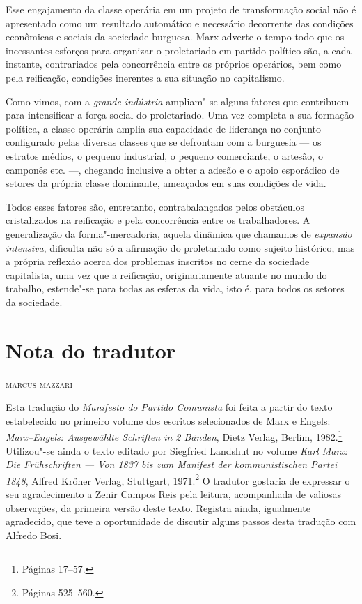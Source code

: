 Esse engajamento da classe operária em um projeto de transformação
social não é apresentado como um resultado automático e necessário
decorrente das condições econômicas e sociais da sociedade burguesa.
Marx adverte o tempo todo que os incessantes esforços para organizar o
proletariado em partido político são, a cada instante, contrariados
pela concorrência entre os próprios operários, bem como pela reificação,
condições inerentes a sua situação no capitalismo.

Como vimos, com a \textit{grande indústria} ampliam"-se alguns fatores que
contribuem para intensificar a força social do proletariado. Uma vez
completa a sua formação política, a classe operária amplia sua
capacidade de liderança no conjunto configurado pelas diversas classes
que se defrontam com a burguesia --- os estratos médios, o pequeno
industrial, o pequeno comerciante, o artesão, o camponês etc. ---, chegando
inclusive a obter a adesão e o apoio esporádico de setores da própria
classe dominante, ameaçados em suas condições de vida. 

Todos esses fatores são, entretanto, contrabalançados pelos obstáculos
cristalizados na reificação e pela concorrência entre os trabalhadores.
A generalização da forma"-mercadoria, aquela dinâmica que chamamos de
\textit{expansão intensiva}, dificulta não só a afirmação do proletariado como
sujeito histórico, mas a própria reflexão acerca dos problemas
inscritos no cerne da sociedade capitalista, uma vez que a reificação,
originariamente atuante no mundo do trabalho, estende"-se para todas
as esferas da vida, isto é, para todos os setores da sociedade.

\chapter{Nota do tradutor}

\begin{flushright}
\textsc{marcus mazzari }
\end{flushright}

\noindent{}Esta tradução do \textit{Manifesto do Partido Comunista} foi feita a
partir do texto estabelecido no primeiro volume dos escritos selecionados de
Marx e Engels: \textit{Marx--Engels: Ausgewählte Schriften in 2
Bänden}, Dietz Verlag, Berlim, 1982.\footnote{Páginas 17--57.} Utilizou"-se
ainda o texto editado por Siegfried Landshut no volume \textit{Karl
Marx: Die Frühschriften --- Von 1837 bis zum Manifest der
kommunistischen Partei 1848}, Alfred Kröner Verlag, Stuttgart, 1971.\footnote{Páginas 525--560.} O tradutor gostaria de expressar o seu
agradecimento a Zenir Campos Reis pela leitura, acompanhada de valiosas
observações, da primeira versão deste texto. Registra ainda, igualmente
agradecido, que teve a oportunidade de discutir alguns passos desta
tradução com Alfredo Bosi.



